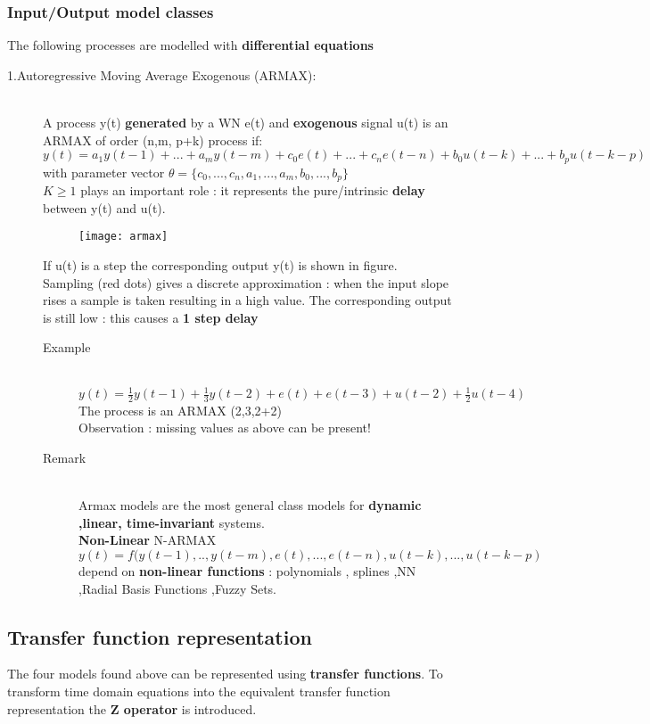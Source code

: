 \subsubsection{Input/Output model classes}
The following processes are modelled with \textbf{differential equations}
\begin{description}
\item[1.Autoregressive Moving Average Exogenous (ARMAX):]\hfill\\
A process y(t) \textbf{generated} by a WN e(t) and \textbf{exogenous} signal u(t) is an ARMAX of order (n,m, p+k) process if:
$$ y(t) = a_1y(t-1)+...+a_my(t-m)+ c_0e(t)+...+c_ne(t-n)+ b_0u(t-k)+...+b_pu(t-k-p)$$ 
with parameter vector $ \theta = \{c_0 ,...,c_n,a_1,...,a_m,b_0,...,b_p\}$\\
$ K \geq 1$ plays an important role : it represents the pure/intrinsic \textbf{delay} between y(t) and u(t).
\begin{figure}[!h]
  \centering
  \texttt{[image: armax]}
\end{figure}
If u(t) is a step the corresponding output y(t) is shown in figure.\\
Sampling (red dots) gives a discrete approximation : when the input slope rises a sample is taken resulting in a high value. The corresponding output is still low : this causes a \textbf{1 step delay}
\begin{description}
\item[Example]\hfill\\
$ y(t)=\frac{1}{2}y(t-1)+\frac{1}{3}y(t-2)+e(t)+e(t-3)+u(t-2)+\frac{1}{2}u(t-4) $
The process is an ARMAX (2,3,2+2)\\
Observation : missing values as above can be present!
\item[Remark]\hfill\\
Armax models are the most general class models for \textbf{dynamic ,linear, time-invariant} systems.\\
\textbf{Non-Linear} N-ARMAX $ y(t) = f(y(t-1),..,y(t-m),e(t),...,e(t-n),u(t-k),...,u(t-k-p)$ \\ depend on \textbf{non-linear functions} : polynomials , splines ,NN ,Radial Basis Functions ,Fuzzy Sets.
\end{description}
\end{description}


\subsection{Transfer function representation}
The four models found above can be represented using \textbf{transfer functions}.
To transform time domain equations into the equivalent transfer function representation the \textbf{Z operator} is introduced.
